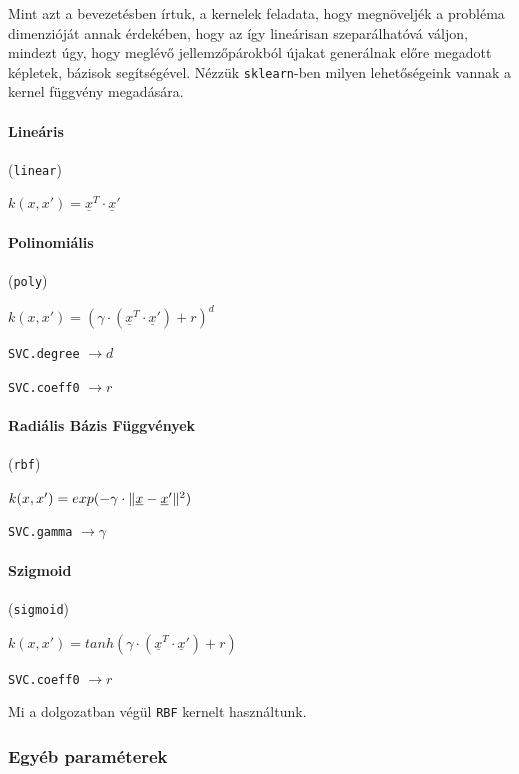 
Mint azt a bevezetésben írtuk, a kernelek feladata, hogy megnöveljék a probléma
dimenzióját annak érdekében, hogy az így lineárisan szeparálhatóvá váljon, mindezt 
úgy, hogy meglévő jellemzőpárokból újakat generálnak előre megadott képletek,
bázisok segítségével. Nézzük \texttt{sklearn}-ben milyen lehetőségeink vannak a 
kernel függvény megadására.


\paragraph{Lineáris} (\texttt{linear})

$ k(x, x') = \underline{x}^T \cdot \underline{x}' $


\paragraph{Polinomiális} (\texttt{poly})

$ k(x, x') = (\gamma \cdot (\underline{x}^T \cdot \underline{x}') + r)^d $

\texttt{SVC.degree} $ \rightarrow d $

\texttt{SVC.coeff0} $ \rightarrow r $

\paragraph{Radiális Bázis Függvények} (\texttt{rbf})


$ k(x, x') = exp( - \gamma \cdot \lVert\underline{x} - \underline{x}'\rVert^2) $

\texttt{SVC.gamma} $ \rightarrow \gamma $




\paragraph{Szigmoid} (\texttt{sigmoid})

$ k(x, x') = tanh(\gamma \cdot (\underline{x}^T \cdot \underline{x}') + r) $

\texttt{SVC.coeff0} $ \rightarrow r $


\noindent
Mi a dolgozatban végül \texttt{RBF} kernelt használtunk.

\subsubsection{Egyéb paraméterek}

